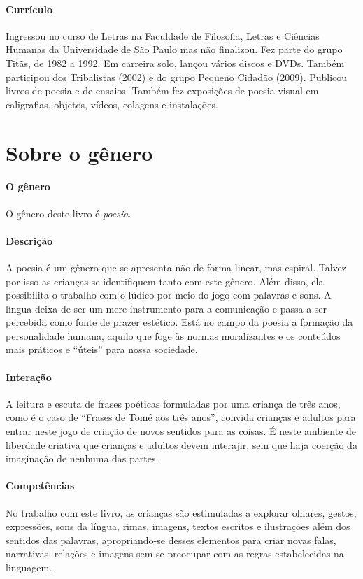 \documentclass[11pt]{extarticle}
\begin{document}
\paragraph{Currículo} 
Ingressou no curso de Letras na Faculdade de Filosofia, Letras e Ciências Humanas 
da Universidade de São Paulo mas não finalizou.
Fez parte do grupo Titãs, de 1982 a 1992.
Em carreira solo, lançou vários discos e DVDs.
Também participou dos Tribalistas (2002) e do grupo Pequeno
Cidadão (2009).
Publicou livros de poesia e de ensaios.
Também fez exposições de poesia visual em caligrafias, objetos,
vídeos, colagens e instalações.

\section{Sobre o gênero}

\paragraph{O gênero} O gênero deste livro é \textit{poesia}. 

\paragraph{Descrição} A poesia é um gênero que se apresenta não de forma
linear, mas espiral. Talvez por isso as crianças se identifiquem
tanto com este gênero. Além disso, ela possibilita o trabalho com
o lúdico por meio do jogo com palavras e sons. A língua deixa de
ser um mere instrumento para a comunicação e passa a ser percebida
como fonte de prazer estético. Está no campo da poesia a formação da personalidade
humana, aquilo que foge às normas moralizantes e os conteúdos mais
práticos e ``úteis'' para nossa sociedade. 

\paragraph{Interação} A leitura e escuta de frases poéticas 
formuladas por uma criança de três anos, como é o caso de ``Frases de Tomé aos três anos'',
convida crianças e adultos para entrar neste jogo de criação de novos sentidos
para as coisas. É neste ambiente de liberdade criativa que crianças e adultos devem
interajir, sem que haja coerção da imaginação de nenhuma das partes. 


\paragraph{Competências} No trabalho com este livro, as crianças são 
estimuladas a explorar olhares, gestos, expressões, sons da língua, 
rimas, imagens, textos escritos e ilustrações além dos sentidos das palavras, 
apropriando-se desses elementos para criar novas falas, narrativas, relações 
e imagens sem se preocupar com as regras estabelecidas na linguagem.
\end{document}
